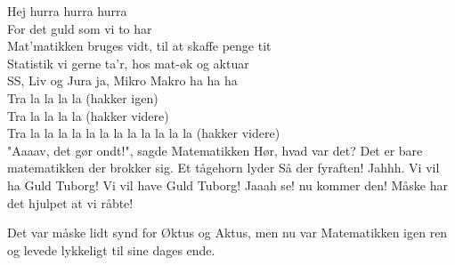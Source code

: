 \documentclass[a4paper,11pt]{article}
\begin{document}
\begin{sketch}
 Hej hurra hurra hurra \\
For det guld som vi to har \\
Mat'matikken bruges vidt, til at skaffe penge tit \\
Statistik vi gerne ta'r, hos mat-øk og aktuar \\
SS, Liv og Jura ja, Mikro Makro ha ha ha \\
Tra la la la la (hakker igen) \\
Tra la la la la (hakker videre) \\
Tra la la la la la la la la la la la la (hakker videre) \\
 "Aaaav, det gør ondt!", sagde Matematikken
 Hør, hvad var det?
 Det er bare matematikken der brokker sig.
\scene Et tågehorn lyder
 Så der fyraften!
 Jahhh. 	 
 Vi vil ha Guld Tuborg! Vi vil have Guld Tuborg!
 Jaaah se! nu kommer den!
 Måske har det hjulpet at vi råbte! 

 Det var måske lidt synd for Øktus og Aktus, men nu var Matematikken igen ren og levede lykkeligt til sine dages ende.
\end{sketch}
\end{document}

